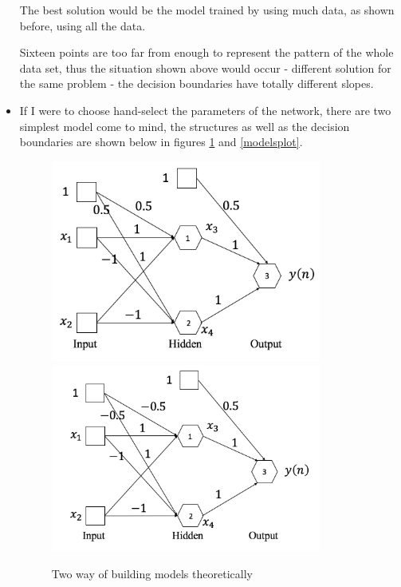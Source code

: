 \documentclass[a4paper]{article}
\begin{document}
\begin{spacing}{2.0}
\begin{itemize}
The best solution would be the model trained by using much data, as shown before, using all the data. 

Sixteen points are too far from enough to represent the pattern of the whole data set, thus the situation shown above would occur - different solution for the same problem - the decision boundaries have totally different slopes.

\item If I were to choose hand-select the parameters of the network, there are two simplest model come to mind, the structures as well as the decision boundaries are shown below in figures \ref{models} and \ref{modelsplot}.
\begin{figure}[H]
\centering
\includegraphics[width = 3.5in]{positive.jpg}
\includegraphics[width = 3.5in]{negative.jpg}
\caption{Two way of building models theoretically}
\label{models}
\end{figure}


\end{itemize}
\end{spacing}
\end{document}
